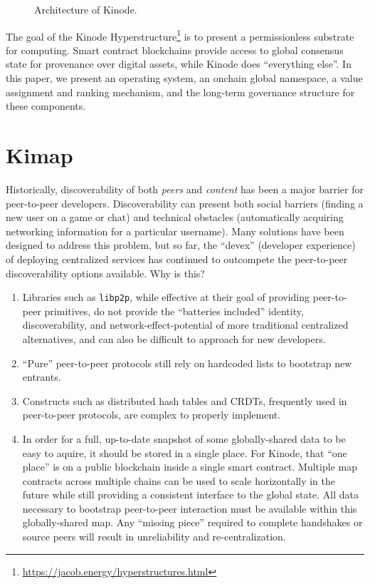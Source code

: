 \documentclass[runningheads]{llncs}
\begin{document}
\begin{figure}[H]
    \centering
    \caption{Architecture of Kinode.}
    \label{fig:triangle}
\end{figure}

The goal of the Kinode Hyperstructure\footnote{\url{https://jacob.energy/hyperstructures.html}}
is to present a permissionless substrate for computing.
Smart contract blockchains provide access to global consensus state for provenance over digital assets, while Kinode does ``everything else''.
In this paper, we present an operating system, an onchain global namespace, a value assignment and ranking mechanism, and the long-term governance structure for these components.

\section{Kimap}
\label{sec:kimap}

Historically, discoverability of both \textit{peers} and \textit{content} has been a major barrier for peer-to-peer developers.
Discoverability can present both social barriers (finding a new user on a game or chat) and technical obstacles (automatically acquiring networking information for a particular username).
Many solutions have been designed to address this problem, but so far, the ``devex'' (developer experience) of deploying centralized services has continued to outcompete the peer-to-peer discoverability options available.
Why is this?
\begin{enumerate}
    \item Libraries such as \verb|libp2p|, while effective at their goal of providing peer-to-peer primitives, do not provide the ``batteries included'' identity, discoverability, and network-effect-potential of more traditional centralized alternatives, and can also be difficult to approach for new developers.
    \item ``Pure'' peer-to-peer protocols still rely on hardcoded lists to bootstrap new entrants.
    \item Constructs such as distributed hash tables and CRDTs, frequently used in peer-to-peer protocols, are complex to properly implement.
    \item In order for a full, up-to-date snapshot of some globally-shared data to be easy to aquire, it should be stored in a single place.
    \subitem For Kinode, that ``one place'' is on a public blockchain inside a single smart contract.
    \subitem Multiple map contracts across multiple chains can be used to scale horizontally in the future while still providing a consistent interface to the global state.
    \subitem All data necessary to bootstrap peer-to-peer interaction must be available within this globally-shared map.
    \subitem Any ``missing piece'' required to complete handshakes or source peers will result in unreliability and re-centralization.
\end{enumerate}
\end{document}
